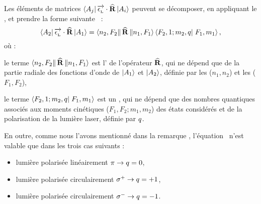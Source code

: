 Les éléments de matrices $\BraOpKet{A_j}{\Polarisation\cdot\OperR}{A_i}$ peuvent se décomposer, en appliquant le , et prendre la forme suivante~\cite{CDL86b} : 
\newcommand{\LePhantom}{\vphantom{J'}}
\begin{equation}
	\BraOpKet{A_2}{\Polarisation\cdot\OperR}{A_1} 
	= %
	   \BraAbsKet{n_2,F_2}{\OperR}{n_1,F_1}
	\, \BraKet{F_2,1;m_2,\polarindice}{F_1,m_1} 
	\virguleformule
	\label{eq:ElementMatriceReduite}
\end{equation}
où :
\begin{ditemize}
	\item le terme $\BraAbsKet{n_2,F_2}{\OperR}{n_1,F_1}$ est l' de l'opérateur $\OperR$, qui ne dépend que de la partie radiale des fonctions d'onde de $\Ket{A_1}$ et $\Ket{A_2}$, définie par les  ($n_1, n_2$) et les  ($F_1, F_2$),
\item le terme $\BraKet{F_2,1;m_2,\polarindice}{F_1,m_1}$ est un , qui ne dépend que des nombres quantiques associés aux moments cinétiques ($F_1, F_2;m_1,m_2$) des états considérés et de la polarisation de la lumière laser, définie par $\polarindice$.
\end{ditemize}
En outre, comme nous l'avons mentionné dans la remarque , l'équation~ n'est valable que dans les trois cas suivants :
\begin{itemize}
	\item lumière polarisée linéairement $\pi \rightarrow \polarindice = 0$,
	\item lumière polarisée circulairement $\sigma^+ \rightarrow \polarindice = +1$,
	\item lumière polarisée circulairement $\sigma^- \rightarrow \polarindice = -1$.
\end{itemize}


